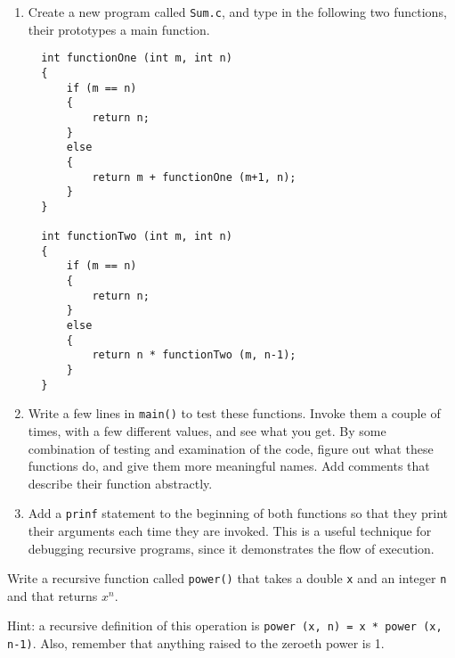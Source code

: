 \begin{exercise}
\begin{enumerate}


\item Create a new program called {\tt Sum.c},
and type in the following two functions, their prototypes a main function.

\begin{verbatim}
  int functionOne (int m, int n) 
  {
      if (m == n) 
      {
          return n;
      } 
      else 
      {
          return m + functionOne (m+1, n);
      }
  }

  int functionTwo (int m, int n) 
  {
      if (m == n) 
      {
          return n;
      } 
      else 
      {
          return n * functionTwo (m, n-1);
      }
  }
\end{verbatim}
%
\item Write a few lines in {\tt main()} to test these functions.
Invoke them a couple of times, with a few different values,
and see what you get.  By some combination of testing and
examination of the code, figure out what these functions do,
and give them more meaningful names.  Add comments that
describe their function abstractly.

\item Add a {\tt prinf} statement to the beginning of both
functions so that they print their arguments each time they are
invoked.  This is a useful technique for debugging recursive
programs, since it demonstrates the flow of execution.

\end{enumerate}
\end{exercise}

\begin{exercise}
\label{ex.power}
Write a recursive function called {\tt power()} that
takes a double {\tt x} and an integer {\tt n} and that
returns $x^n$.  

Hint: a recursive definition of this
operation is {\tt power (x, n) = x * power (x, n-1)}.
Also, remember that anything raised to the zeroeth power
is 1.
\end{exercise}


%

